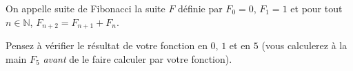 \exer{}
\setcounter{numques}{0}

On appelle suite de Fibonacci la suite $F$ définie par
$F_{0}=0$, $F_{1}=1$ et pour tout $n\in\mathbb{N}$, $F_{n+2} = F_{n+1} + F_{n}$.


Pensez à vérifier le résultat de votre fonction en $0$, $1$ et en $5$
(vous calculerez à la main $F_{5}$ \emph{avant} de le faire calculer
par votre fonction).